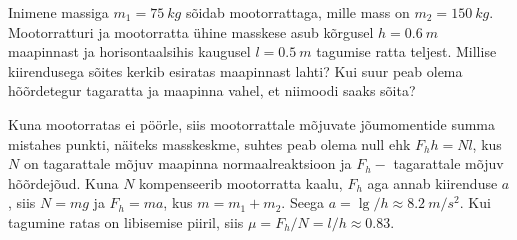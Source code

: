
Inimene massiga $m_{1}=\SI{75}{kg}$ sõidab mootorrattaga, mille mass on $m_{2}=\SI{150}{kg}$. Mootorratturi ja mootorratta ühine masskese asub kõrgusel $h=\SI{0,6}{m}$ maapinnast ja horisontaalsihis kaugusel $l=\SI{0,5}{m}$ tagumise ratta teljest. Millise kiirendusega sõites kerkib esiratas maapinnast lahti? Kui suur peab olema hõõrdetegur tagaratta ja maapinna vahel, et niimoodi saaks sõita?

\hint

\solu
Kuna mootorratas ei pöörle, siis mootorrattale mõjuvate jõumomentide summa mistahes punkti, näiteks masskeskme, suhtes peab olema null ehk $F_{h} h=N l$, kus $N$ on tagarattale mõjuv maapinna normaalreaktsioon ja $F_{h}-$ tagarattale mõjuv hõõrdejõud. Kuna $N$ kompenseerib mootorratta kaalu, $F_{h}$ aga annab kiirenduse $a$, siis $N=m g$ ja $F_{h}=m a$, kus $m=m_{1}+m_{2}$. Seega $a=\lg / h \approx\SI{8,2}{m/s^2}$. Kui
tagumine ratas on libisemise piiril, siis $\mu=F_{h} / N=l / h \approx \num{0,83}$.
\probend
